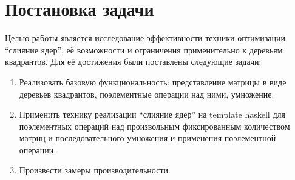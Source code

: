 
\section{Постановка задачи}
Целью работы является исследование эффективности техники оптимизации \enquote{слияние ядер}, её возможности и ограничения применительно к деревьям квадрантов. Для её достижения были поставлены следующие задачи:
\begin{enumerate}
    \item Реализовать базовую функциональность: представление матрицы в виде деревьев квадрантов, поэлементные операции над ними, умножение.
    \item Применить технику реализации \enquote{слияние ядер} на template haskell для поэлементных операций над произвольным фиксированным количеством матриц и последовательного умножения и применения поэлементной операции.
    \item Произвести замеры производительности.
\end{enumerate}
